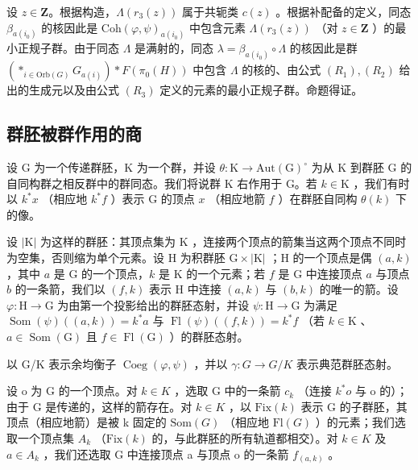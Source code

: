 设 \(z \in \mathbf{Z}\)。根据构造，\(\Lambda(r_3(z))\) 属于共轭类 \(c(z)\) 。根据补配备的定义，同态 \(\beta_{a(i_0)}\) 的核因此是 \(\mathrm{Coh}(\varphi, \psi)_{a(i_0)}\) 中包含元素 \(\Lambda(r_3(z))\) （对 \(z \in \mathbf{Z}\) ）的最小正规子群。由于同态 \(\Lambda\) 是满射的，同态 \(\lambda = \beta_{a(i_0)} \circ \Lambda\) 的核因此是群 \(\left( *_{i \in \mathrm{Orb}(G)} G_{a(i)} \right) * F(\pi_0(H))\) 中包含 \(\Lambda\) 的核的、由公式 \((R_1), (R_2)\) 给出的生成元以及由公式 \((R_3)\) 定义的元素的最小正规子群。命题得证。

\subsection{群胚被群作用的商}

设 G 为一个传递群胚，K 为一个群，并设 \(\theta\colon\mathrm{K}\to\mathrm{Aut}(\mathrm{G})^{\circ}\) 为从 K 到群胚 G 的自同构群之相反群中的群同态。我们将说群 K 右作用于 G。若 \(k\in\mathrm{K}\) ，我们有时以 \(k^{*}x\) （相应地 \(k^{*}f\) ）表示 G 的顶点 \(x\) （相应地箭 \(f\) ）在群胚自同构 \(\theta(k)\) 下的像。

设 \(|\mathrm{K}|\) 为这样的群胚：其顶点集为 \(\mathrm{K}\) ，连接两个顶点的箭集当这两个顶点不同时为空集，否则缩为单个元素。设 \(\mathrm{H}\) 为积群胚 \(\mathrm{G} \times |\mathrm{K}|\) ；\(\mathrm{H}\) 的一个顶点是偶 \((a,k)\) ，其中 \(a\) 是 \(\mathrm{G}\) 的一个顶点，\(k\) 是 \(\mathrm{K}\) 的一个元素；若 \(f\) 是 \(\mathrm{G}\) 中连接顶点 \(a\) 与顶点 \(b\) 的一条箭，我们以 \((f,k)\) 表示 \(\mathrm{H}\) 中连接 \((a,k)\) 与 \((b,k)\) 的唯一的箭。设 \(\varphi: \mathrm{H} \to \mathrm{G}\) 为由第一个投影给出的群胚态射，并设 \(\psi: \mathrm{H} \to \mathrm{G}\) 为满足 \(\operatorname{Som}(\psi)((a,k)) = k^*a\) 与 \(\operatorname{Fl}(\psi)((f,k)) = k^*f\) （若 \(k \in \mathrm{K}\) 、\(a \in \operatorname{Som}(\mathrm{G})\) 且 \(f \in \operatorname{Fl}(\mathrm{G})\) ）的群胚态射。

以 G/K 表示余均衡子 \(\operatorname{Coeg}(\varphi,\psi)\) ，并以 \(\gamma\colon G\to G/K\) 表示典范群胚态射。

设 o 为 G 的一个顶点。对 \(k \in K\) ，选取 G 中的一条箭 \(c_{k}\) （连接 \(k^{*}o\) 与 o 的）；由于 G 是传递的，这样的箭存在。对 \(k \in K\) ，以 \(\text{Fix}(k)\) 表示 G 的子群胚，其顶点（相应地箭）是被 k 固定的 \(\text{Som}(G)\) （相应地 \(\text{Fl}(G)\) ）的元素；我们选取一个顶点集 \(A_{k}\) （\(\text{Fix}(k)\) 的，与此群胚的所有轨道都相交）。对 \(k \in K\) 及 \(a \in A_{k}\) ，我们还选取 G 中连接顶点 a 与顶点 o 的一条箭 \(f_{(a,k)}\) 。

